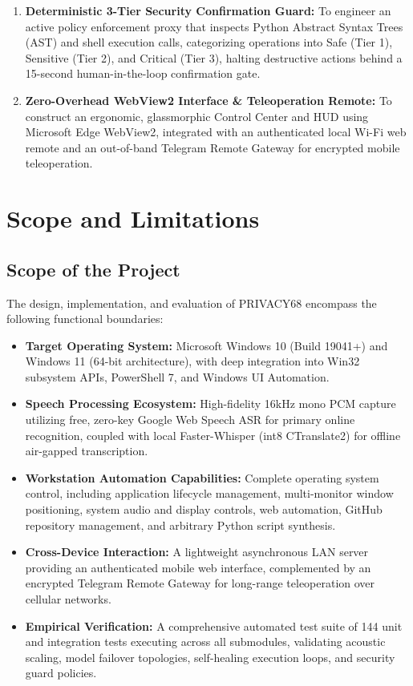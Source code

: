 \begin{enumerate}
    \item \textbf{Deterministic 3-Tier Security Confirmation Guard:} To engineer an active policy enforcement proxy that inspects Python Abstract Syntax Trees (AST) and shell execution calls, categorizing operations into Safe (Tier 1), Sensitive (Tier 2), and Critical (Tier 3), halting destructive actions behind a 15-second human-in-the-loop confirmation gate.
    \item \textbf{Zero-Overhead WebView2 Interface \& Teleoperation Remote:} To construct an ergonomic, glassmorphic Control Center and HUD using Microsoft Edge WebView2, integrated with an authenticated local Wi-Fi web remote and an out-of-band Telegram Remote Gateway for encrypted mobile teleoperation.
\end{enumerate}

\section{Scope and Limitations}

\subsection{Scope of the Project}
The design, implementation, and evaluation of PRIVACY68 encompass the following functional boundaries:
\begin{itemize}
    \item \textbf{Target Operating System:} Microsoft Windows 10 (Build 19041+) and Windows 11 (64-bit architecture), with deep integration into Win32 subsystem APIs, PowerShell 7, and Windows UI Automation.
    \item \textbf{Speech Processing Ecosystem:} High-fidelity 16kHz mono PCM capture utilizing free, zero-key Google Web Speech ASR for primary online recognition, coupled with local Faster-Whisper (int8 CTranslate2) for offline air-gapped transcription.
    \item \textbf{Workstation Automation Capabilities:} Complete operating system control, including application lifecycle management, multi-monitor window positioning, system audio and display controls, web automation, GitHub repository management, and arbitrary Python script synthesis.
    \item \textbf{Cross-Device Interaction:} A lightweight asynchronous LAN server providing an authenticated mobile web interface, complemented by an encrypted Telegram Remote Gateway for long-range teleoperation over cellular networks.
    \item \textbf{Empirical Verification:} A comprehensive automated test suite of 144 unit and integration tests executing across all submodules, validating acoustic scaling, model failover topologies, self-healing execution loops, and security guard policies.
\end{itemize}

